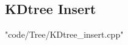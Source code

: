 \documentclass [landscape,8pt,a4paper,twocolumn]{article}
\begin{document}
\subsection{KDtree Insert}
 {"code/Tree/KDtree_insert.cpp"}
\end{document}
